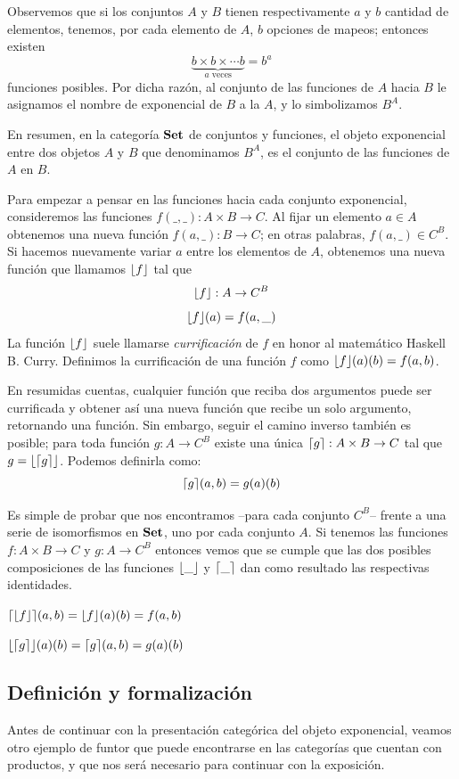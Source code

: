 Observemos que si los conjuntos $A$ y $B$ tienen respectivamente $a$ y $b$ cantidad de elementos, tenemos, por cada elemento de $A$, $b$ opciones de mapeos; entonces existen $$\underbrace{b \times b \times  \cdots  b}_{a \text{ veces}} = b^{a}$$
funciones posibles. Por dicha razón, al conjunto de las funciones de $A$ hacia $B$ le asignamos el nombre de exponencial de $B$ a la $A$, y lo simbolizamos $B^{A}$.

En resumen, en la categoría $\mathbf{Set}$ de conjuntos y funciones, el objeto exponencial entre dos objetos $A$ y $B$ que denominamos $B^{A}$, es el conjunto de las funciones de $A$ en $B$. 

Para empezar a pensar en las funciones hacia cada conjunto exponencial, consideremos las funciones $f(\_,\_) : A \times B \to C$.
Al fijar un elemento $a \in A$ obtenemos una nueva función $f(a,\_) : B \to C$; en otras palabras, $f(a,\_) \in C^{B}$. Si hacemos nuevamente variar $a$ entre los elementos de $A$, obtenemos una nueva función que llamamos $\lfloor f \rfloor$ tal que $$\lfloor f \rfloor : A \to C^{B}$$ $$\lfloor f \rfloor (a) = f(a, \_)$$
La función $\lfloor f \rfloor$ suele llamarse {\it currificación} de $f$ en honor al matemático Haskell B. Curry. Definimos la currificación de una función $f$ como $\lfloor f \rfloor (a)(b) = f(a,b)$. 

En resumidas cuentas, cualquier función que reciba dos argumentos puede ser currificada y obtener así una nueva función que recibe un solo argumento, retornando una función. Sin embargo, seguir el camino inverso también es posible; para toda función $g : A \to C^{B}$ existe una única $\lceil g \rceil : A \times B \to C$ tal que $g = \lfloor \lceil g \rceil \rfloor$. Podemos definirla como: $$\lceil g \rceil(a,b) = g(a)(b)$$  

Es simple de probar que nos encontramos --para cada conjunto $C^B$-- frente a una serie de isomorfismos en $\mathbf{Set}$, uno por cada conjunto $A$. Si tenemos las funciones $f : A \times B\to C$ y $g : A\to C^{B}$ entonces vemos que se cumple que las dos posibles composiciones de las funciones $\lfloor \_ \rfloor$ y $\lceil \_ \rceil$ dan como resultado las respectivas identidades.

$\lceil \lfloor f \rfloor \rceil(a,b) = \lfloor f \rfloor(a)(b) = f(a,b) $

$\lfloor \lceil g \rceil \rfloor(a)(b) = \lceil g \rceil(a,b) = g(a)(b) $

\subsection{Definición y formalización}
Antes de continuar con la presentación categórica del objeto exponencial, veamos otro ejemplo de funtor que puede encontrarse en las categorías que cuentan con productos, y que nos será necesario para continuar con la exposición.


